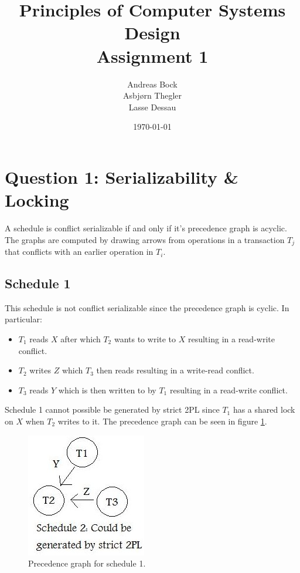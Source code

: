 \documentclass[11pt]{article}
\def\Author{Andreas Bock\\
Asbj\o rn Thegler\\
Lasse Dessau
}
\def\Title{\bf Principles of Computer Systems Design\\ {\Large Assignment 1}}
\begin{document}
\title{\Title}
\author{\Author}
\date{\today}
\maketitle

\section*{Question 1: Serializability \& Locking}

A schedule is conflict serializable if and only if it’s precedence graph is
acyclic. The graphs are computed by drawing arrows from operations in a
transaction $T_j$ that conflicts with an earlier operation in $T_i$.

\subsection*{Schedule 1}

This schedule is not conflict serializable since the precedence graph is
cyclic. In particular:

\begin{itemize}
\item $T_1$ reads $X$ after which $T_2$ wants to write to $X$ resulting in a
read-write conflict.
\item $T_2$ writes $Z$ which $T_3$ then reads resulting in a write-read conflict.
\item $T_3$ reads $Y$ which is then written to by $T_1$ resulting in a
read-write conflict.
\end{itemize}

Schedule 1 cannot possible be generated by strict 2PL since $T_1$ has a shared
lock on $X$ when $T_2$ writes to it.
The precedence graph can be seen in figure \ref{fig:s1}.\\

\begin{figure}[h!]
\begin{center}
\includegraphics[scale=0.45]{2pl1.jpg}
\caption{Precedence graph for schedule 1.}
\label{fig:s1}
\end{center}
\end{figure}
\end{document}
